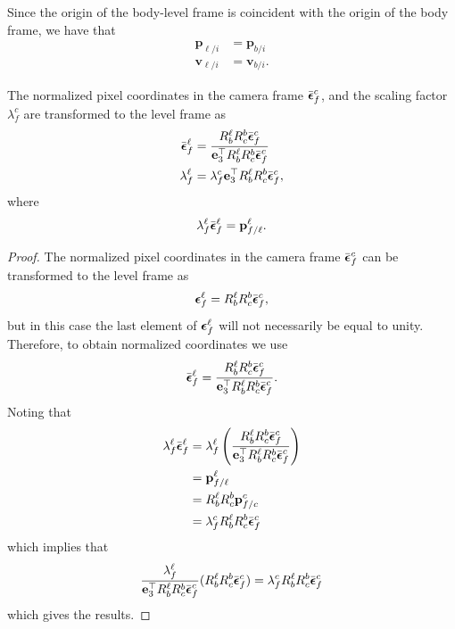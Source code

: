 Since the origin of the body-level frame is coincident with the origin of the body frame, we have that
\begin{align*}
\mathbf{p}_{\ell/i} &= \mathbf{p}_{b/i} \\	
\mathbf{v}_{\ell/i} &= \mathbf{v}_{b/i}.
\end{align*}

\begin{lemma} \label{lem:pixels_in_level_frame}
	The normalized pixel coordinates in the camera frame $\bar{\boldsymbol{\epsilon}}_f^c$, and the scaling factor $\lambda_f^c$ are transformed to the level frame as 
	\begin{align*}
	\bar{\boldsymbol{\epsilon}}_f^\ell &= \frac{R_b^\ell R_c^b \bar{\boldsymbol{\epsilon}}_f^c}{\mathbf{e}_3^\top R_b^\ell R_c^b \bar{\boldsymbol{\epsilon}}_f^c} \\
	\lambda_f^\ell &= \lambda_f^c \mathbf{e}_3^\top R_b^\ell R_c^b \bar{\boldsymbol{\epsilon}}_f^c,
	\end{align*}
	where 
	\[
	\lambda_f^\ell \bar{\boldsymbol{\epsilon}}_f^\ell = \mathbf{p}_{f/\ell}^\ell.
	\]
\end{lemma}
\begin{proof}
	The normalized pixel coordinates in the camera frame $\bar{\boldsymbol{\epsilon}}_f^c$ can be transformed to the level frame as
	\[
	\boldsymbol{\epsilon}_f^\ell = R_b^\ell R_c^b\bar{\boldsymbol{\epsilon}}_f^c,
	\]
	but in this case the last element of $\boldsymbol{\epsilon}_f^\ell$ will not necessarily be equal to unity.  Therefore, to obtain normalized coordinates we use
	\[
	\bar{\boldsymbol{\epsilon}}_f^\ell = \frac{R_b^\ell R_c^b\bar{\boldsymbol{\epsilon}}_f^c}{\mathbf{e}_3^\top R_b^\ell R_c^b\bar{\boldsymbol{\epsilon}}_f^c}.
	\]
	Noting that
	\begin{align*}
	\lambda_f^\ell \bar{\boldsymbol{\epsilon}}_f^\ell 
		&= \lambda_f^\ell \left(\frac{R_b^\ell R_c^b\bar{\boldsymbol{\epsilon}}_f^c}{\mathbf{e}_3^\top R_b^\ell R_c^b\bar{\boldsymbol{\epsilon}}_f^c} \right) \\
		&= \mathbf{p}_{f/\ell}^\ell \\
		&= R_b^\ell R_c^b \mathbf{p}_{f/c}^c \\
		&= \lambda_f^c R_b^\ell R_c^b \bar{\boldsymbol{\epsilon}}_f^c
	\end{align*}
	which implies that
	\[
	\frac{\lambda_f^\ell}{\mathbf{e}_3^\top R_b^\ell R_c^b \bar{\boldsymbol{\epsilon}}_f^c}(R_b^\ell R_c^b \bar{\boldsymbol{\epsilon}}_f^c) = \lambda_f^c R_b^\ell R_c^b \bar{\boldsymbol{\epsilon}}_f^c
	\]
	which gives the results.
\end{proof}

